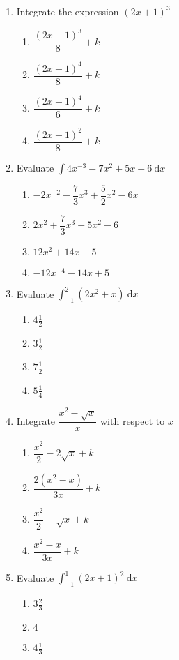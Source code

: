 \begin{multicols}{2}
\begin{enumerate}[label={\arabic*.}]
\begin{enumerate}[label={\Alph*.}]
	\end{enumerate}
\item Integrate the expression \((2x+1)^{3}\)
	\begin{enumerate}[label={\Alph*.}]
	\item \(\dfrac{(2x+1)^{3}}{8} + k\)
	\item \(\dfrac{(2x+1)^{4}}{8} + k\)
	\item \(\dfrac{(2x+1)^{4}}{6} + k\)
	\item \(\dfrac{(2x+1)^{2}}{8} + k\)
	\end{enumerate}
\item Evaluate \(\displaystyle \int 4{x}^{-3} - 7{x}^{2} + 5x - 6\ \mathrm{d}x\)
	\begin{enumerate}[label={\Alph*.}]
	\item \(-2x^{-2}-\dfrac{7}{3}x^{3}+\dfrac{5}{2}x^2-6x\)
	\item \(2x^{2}+\dfrac{7}{3}x^{3}+5x^{2}-6\)
	\item \(12x^{2}+14x-5\)
	\item \(-12x^{-4}-14x+5\)
	\end{enumerate}
\item Evaluate \(\displaystyle \int_{-1}^{2}\left(2x^{2} + x\right)\ \mathrm{d}x\)
	\begin{enumerate}[label={\Alph*.}]
	\item \(4\frac{1}{2}\)
	\item \(3\frac{1}{2}\)
	\item \(7\frac{1}{2}\)
	\item \(5\frac{1}{4}\)
	\end{enumerate}
\item Integrate \(\dfrac{x^{2}-\sqrt{x}}{x}\) with respect to \(x\)
	\begin{enumerate}[label={\Alph*.}]
	\item \(\dfrac{x^{2}}{2} - 2\sqrt{x} + k\)
	\item \(\dfrac{2(x^{2}-x)}{3x} + k\)
	\item \(\dfrac{x^{2}}{2} - \sqrt{x} + k\)
	\item \(\dfrac{x^{2}-x}{3x} + k\)
	\end{enumerate}
\item Evaluate \(\displaystyle \int_{-1}^{1} \left(2x + 1\right)^{2}\ \mathrm{d}x\)
	\begin{enumerate}[label={\Alph*.}]
	\item \(3\frac{2}{3}\)
	\item \(4\)
	\item \(4\frac{1}{3}\)

\end{enumerate}
\end{enumerate}
\end{multicols}
